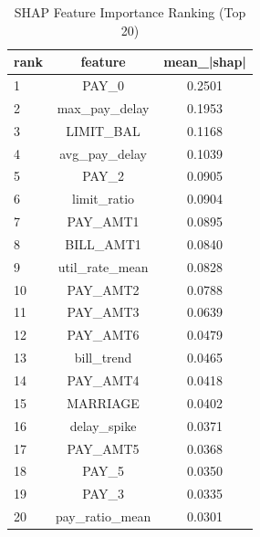 \begin{table}
\centering
\caption{SHAP Feature Importance Ranking (Top 20)}
\label{tab:shap_ranking}
\begin{tabular}{lcc}
\toprule
rank & feature & mean_|shap| \\
\midrule
1 & PAY_0 & 0.2501 \\
2 & max_pay_delay & 0.1953 \\
3 & LIMIT_BAL & 0.1168 \\
4 & avg_pay_delay & 0.1039 \\
5 & PAY_2 & 0.0905 \\
6 & limit_ratio & 0.0904 \\
7 & PAY_AMT1 & 0.0895 \\
8 & BILL_AMT1 & 0.0840 \\
9 & util_rate_mean & 0.0828 \\
10 & PAY_AMT2 & 0.0788 \\
11 & PAY_AMT3 & 0.0639 \\
12 & PAY_AMT6 & 0.0479 \\
13 & bill_trend & 0.0465 \\
14 & PAY_AMT4 & 0.0418 \\
15 & MARRIAGE & 0.0402 \\
16 & delay_spike & 0.0371 \\
17 & PAY_AMT5 & 0.0368 \\
18 & PAY_5 & 0.0350 \\
19 & PAY_3 & 0.0335 \\
20 & pay_ratio_mean & 0.0301 \\
\bottomrule
\end{tabular}
\end{table}
